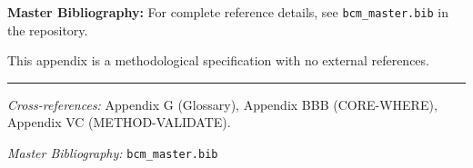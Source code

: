 \begin{tcolorbox}[colback=blue!5!white, colframe=blue!75!black]
\textbf{Master Bibliography:} For complete reference details, see
\texttt{bcm\_master.bib} in the repository.

This appendix is a methodological specification with no external references.
\end{tcolorbox}

\nocite{bcm_master}



\vspace{1em}
\hrule
\vspace{0.5em}

\noindent\textit{Cross-references:}
Appendix G (Glossary),
Appendix BBB (CORE-WHERE),
Appendix VC (METHOD-VALIDATE).

\noindent\textit{Master Bibliography:} \texttt{bcm\_master.bib}


